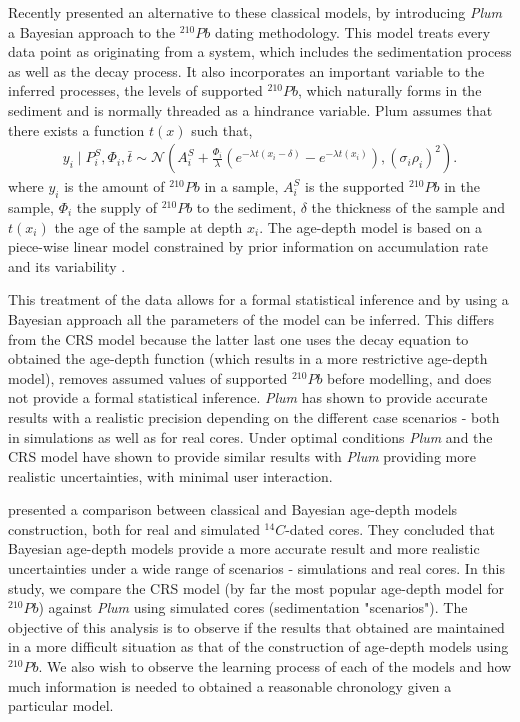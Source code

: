 \documentclass [10pt] {article}
\begin{document}
Recently \citet{Aquino2018} presented an alternative to these classical models, by introducing \textit{Plum} a Bayesian approach to the $^{210}Pb$ dating methodology. 
This model treats every data point as originating from a system, which includes the sedimentation process as well as the decay process. 
It also incorporates an important variable to the inferred processes, the levels of supported $^{210}Pb$, which naturally forms in the sediment and is normally threaded as a hindrance variable.
Plum assumes that there exists a function $t(x)$ such that,
\begin{eqnarray}
y_i\mid P^S_i, \Phi_i, \bar{t}\sim \mathcal{N} \left(A^S_i+\frac{\Phi_i}{\lambda} \left( e^{-\lambda t(x_i-\delta)} - e^{-\lambda t(x_i)} \right), (\sigma_i\rho_i)^2 \right). 
\end{eqnarray}
where $y_i$ is the amount of $^{210}Pb$ in a sample, $A_i^S$ is the supported $^{210}Pb$ in the sample, $\Phi_i$ the supply of $^{210}Pb$ to the sediment, $\delta$ the thickness of the sample and $t(x_i)$ the age of the sample at depth $x_i$. 
The age-depth model is based on a piece-wise linear model constrained by prior information on accumulation rate and its variability \citep{Blaauw2011}.

This treatment of the data allows for a formal statistical inference and by using a Bayesian approach all the parameters of the model can be inferred.
This differs from the CRS model because the latter last one uses the decay equation to obtained the age-depth function (which results in a more restrictive age-depth model), removes assumed values of supported $^{210}Pb$ before modelling, and does not provide a formal statistical inference.
\textit{Plum} has shown to provide accurate results with a realistic precision depending on the different case scenarios \citep{Aquino2020} - both in simulations as well as for real cores.
Under optimal conditions \textit{Plum} and the CRS model have shown to provide similar results \citep{Aquino2020} with \textit{Plum} providing more realistic uncertainties, with minimal user interaction. 

\citet{Blaauw2018} presented a comparison between classical and Bayesian age-depth models construction, both for real and simulated $^{14}C$-dated cores.
They concluded that Bayesian age-depth models provide a more accurate result and more realistic uncertainties under a wide range of scenarios - simulations and real cores.  
In this study, we compare the CRS model (by far the most popular age-depth model for $^{210}Pb$) against \textit{Plum} using simulated cores (sedimentation "scenarios").
The objective of this analysis is to observe if the results that \citet{Blaauw2018} obtained are maintained in a more difficult situation as that of the construction of age-depth models using $^{210}Pb$.
We also wish to observe the learning process of each of the models and how much information is needed to obtained a reasonable chronology given a particular model. 
\end{document}
